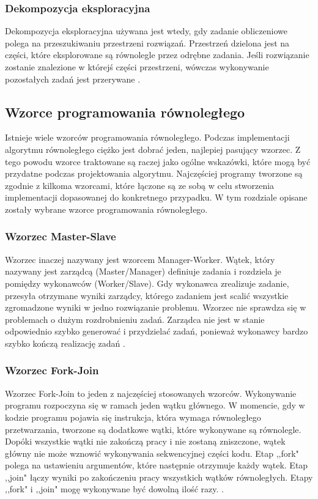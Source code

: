 \documentclass[12pt]{article}
\begin{document}
\subsubsection{Dekompozycja eksploracyjna}
Dekompozycja eksploracyjna używana jest wtedy, gdy zadanie obliczeniowe polega na przeszukiwaniu przestrzeni rozwiązań. Przestrzeń dzielona
jest na części, które eksplorowane są równolegle przez odrębne zadania. Jeśli rozwiązanie zostanie znalezione w którejś części przestrzeni,
wówczas wykonywanie pozostałych zadań jest przerywane \cite{wprowadzenie-do-obliczen-rownoleglych}.

\subsection{Wzorce programowania równoległego}
Istnieje wiele wzorców programowania równoległego. Podczas implementacji algorytmu równoległego ciężko jest dobrać jeden, najlepiej pasujący wzorzec.
Z tego powodu wzorce traktowane są raczej jako ogólne wskazówki, które mogą być przydatne podczas projektowania algorytmu. Najczęściej programy
tworzone są zgodnie z kilkoma wzorcami, które łączone są ze sobą w celu stworzenia implementacji dopasowanej do konkretnego przypadku.
W tym rozdziale opisane zostały wybrane wzorce programowania równoległego.

\subsubsection{Wzorzec Master-Slave}
Wzorzec inaczej nazywany jest wzorcem Manager-Worker. Wątek, który nazywany jest zarządcą (Master/Manager)
definiuje zadania i rozdziela je pomiędzy wykonawców (Worker/Slave). Gdy wykonawca zrealizuje zadanie, przesyła
otrzymane wyniki zarządcy, którego zadaniem jest scalić wszystkie zgromadzone wyniki w jedno rozwiązanie problemu.
Wzorzec nie sprawdza się w problemach o dużym rozdrobnieniu zadań. Zarządca nie jest w stanie odpowiednio szybko generować
i przydzielać zadań, ponieważ wykonawcy bardzo szybko kończą realizację zadań \cite{wprowadzenie-do-obliczen-rownoleglych}.

\subsubsection{Wzorzec Fork-Join}
Wzorzec Fork-Join to jeden z najczęściej stosowanych wzorców. Wykonywanie programu rozpoczyna się
w ramach jeden wątku głównego. W momencie, gdy w kodzie programu pojawia się instrukcja, która wymaga
równoległego przetwarzania, tworzone są dodatkowe wątki, które wykonywane są równolegle. Dopóki wszystkie
wątki nie zakończą pracy i nie zostaną zniszczone, wątek główny nie może wznowić wykonywania
sekwencyjnej części kodu. Etap ,,fork" polega na ustawieniu argumentów, które następnie otrzymuje każdy wątek.
Etap ,,join" łączy wyniki po zakończeniu pracy wszystkich wątków równoległych. Etapy ,,fork" i ,,join"
mogę wykonywane być dowolną ilość razy. \cite{parallel-design-patterns}.
\end{document}
